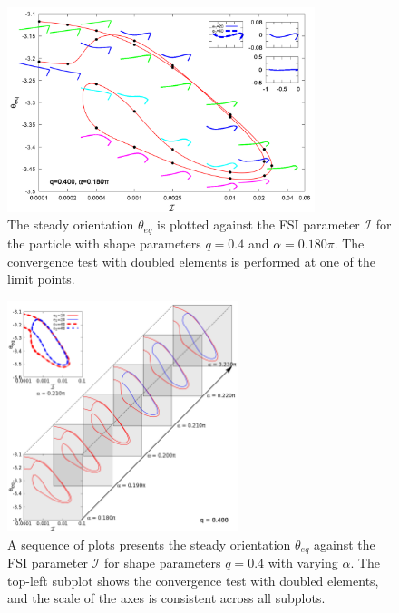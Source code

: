 \documentclass[a4paper,12pt]{report}
\begin{document}
\begin{figure}[!h]
	\begin{center}
		\includegraphics[width=0.8\textwidth]{plot/initial_combine_elastic_beam_I_theta_q_0.400_alpha_0.180pi_initial_-4.80_paper.png}
        \caption{The steady orientation $\theta_{eq}$ is plotted against the FSI parameter $\mathcal{I}$ for the particle with shape parameters $q = 0.4$ and $\alpha = 0.180\pi$. The convergence test with doubled elements is performed at one of the limit points.}
        \label{fig:8}
	\end{center}
\end{figure}
\begin{figure}[!h]
	\begin{center}
		\includegraphics[width=0.6\textwidth]{plot/elastic_beam_I_theta_q_0.400_alpha_paper.png}
		\caption{A sequence of plots presents the steady orientation $\theta_{eq}$ against the FSI parameter $\mathcal{I}$ for shape parameters $q = 0.4$ with varying $\alpha$. The top-left subplot shows the convergence test with doubled elements, and the scale of the axes is consistent across all subplots.}
		\label{fig:9}
	\end{center}
\end{figure}
\end{document}
